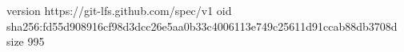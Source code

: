 version https://git-lfs.github.com/spec/v1
oid sha256:fd55d908916cf98d3dcc26e5aa0b33c4006113e749c25611d91ccab88db3708d
size 995
